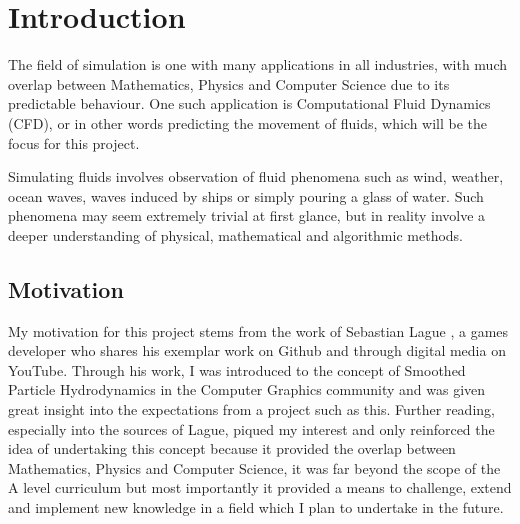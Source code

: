 \documentclass[write-up.tex]{subfiles}
\begin{document}
\section{Introduction}
The field of simulation is one with many applications in all industries, with much overlap between Mathematics, Physics and Computer Science due to its predictable behaviour. One such application is Computational Fluid Dynamics (CFD), or in other words predicting the movement of fluids, which will be the focus for this project.

Simulating fluids involves observation of fluid phenomena such as wind, weather, ocean waves, waves induced by ships or simply pouring a glass of water. Such phenomena may seem extremely trivial at first glance, but in reality involve a deeper understanding of physical, mathematical and algorithmic methods.


\subsection{Motivation}

My motivation for this project stems from the work of Sebastian Lague \cite{Lague}, a games developer who shares his exemplar work on Github and through digital media on YouTube. Through his work, I was introduced to the concept of Smoothed Particle Hydrodynamics in the Computer Graphics community and was given great insight into the expectations from a project such as this. Further reading, especially into the sources of Lague, piqued my interest and only reinforced the idea of undertaking this concept because it provided the overlap between Mathematics, Physics and Computer Science, it was far beyond the scope of the A level curriculum but most importantly it provided a means to challenge, extend and implement new knowledge in a field which I plan to undertake in the future.
\end{document}
